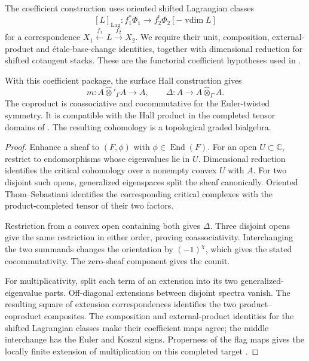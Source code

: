 The coefficient construction uses oriented shifted Lagrangian classes
\[
 [L]_{\mathrm{Lag}}:f_1^*\Phi_1\longrightarrow
             f_2^!\Phi_2[-\operatorname{vdim}L]
\]
for a correspondence $X_1\xleftarrow{f_1}L\xrightarrow{f_2}X_2$.
We require their unit, composition, external-product and \'etale-base-change
identities, together with dimensional reduction for shifted cotangent
stacks. These are the functorial coefficient hypotheses used in
\cite[Theorem~2.4 and Section~6]{DHKSvSurface}.

\begin{theorem}
With this coefficient package, the surface Hall construction gives
\[
 m:A\widehat\otimes'_{\Gamma}A\longrightarrow A,
 \qquad
 \Delta:A\longrightarrow A\widehat\otimes_{\Gamma}A.
\]
The coproduct is coassociative and cocommutative for the Euler-twisted
symmetry. It is compatible with the Hall product in the completed
tensor domains of \cite[Proposition~6.4]{DHKSvSurface}. The resulting
cohomology is a topological graded bialgebra.
\end{theorem}
\begin{proof}
Enhance a sheaf to $(F,\phi)$ with $\phi\in\operatorname{End}(F)$.
For an open $U\subset\mathbb C$, restrict to endomorphisms whose
eigenvalues lie in $U$. Dimensional reduction identifies the critical
cohomology over a nonempty convex $U$ with $A$. For two disjoint such
opens, generalized eigenspaces split the sheaf canonically. Oriented
Thom--Sebastiani identifies the corresponding critical complexes with
the product-completed tensor of their two factors.

Restriction from a convex open containing both gives $\Delta$.
Three disjoint opens give the same restriction in either order,
proving coassociativity. Interchanging the two summands changes the
orientation by $(-1)^\chi$, which gives the stated cocommutativity.
The zero-sheaf component gives the counit.

For multiplicativity, split each term of an extension into its two
generalized-eigenvalue parts. Off-diagonal extensions between disjoint
spectra vanish. The resulting square of extension correspondences
identifies the two product--coproduct composites. The composition and
external-product identities for the shifted Lagrangian classes make
their coefficient maps agree; the middle interchange has the Euler
and Koszul signs. Properness of the flag maps gives the locally finite
extension of multiplication on this completed target
\cite[Propositions~6.1 and~6.4]{DHKSvSurface}.
\end{proof}

